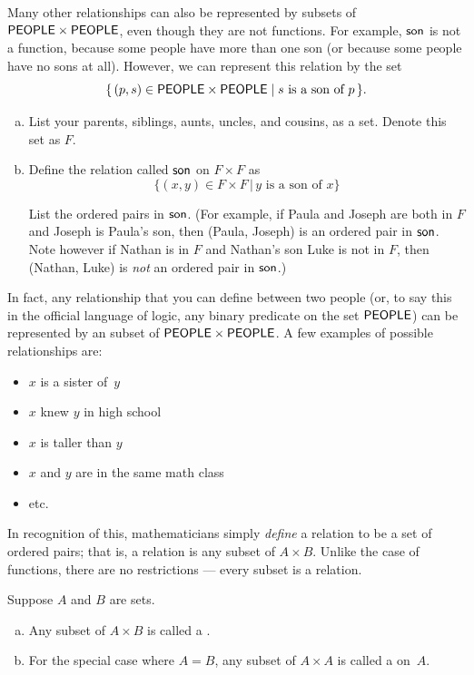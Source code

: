 Many other relationships can also be represented by subsets of $\sf{PEOPLE} \times \sf{PEOPLE}$, even though they are not functions. For example, $\sf{son}$ is not a function, because some people have more than one son (or because some people have no sons at all). However, we can represent this relation by the set
	$$ \{\, (p,s) \in  \sf{PEOPLE} \times \sf{PEOPLE} \mid \text{$s$ is a son of~$p$} \,\} .$$
	
\begin{exercise}\label{exercise:EquivalenceRelationsChap:student_son}
\begin{enumerate}[(a)]
\item
List your parents, siblings, aunts, uncles, and cousins, as a set.  Denote this set as $F$.
\item
Define the relation called $\sf{son}$ on $F \times F$ as
\[
\{ (x,y) \in F \times F \,|\, y \text{ is a son of } x \} \]

\noindent
List the ordered pairs in $\sf{son}$. (For example, if Paula and Joseph are both in $F$ and Joseph is Paula's son, then (Paula, Joseph) is an ordered pair in $\sf{son}$.  Note however if Nathan is in $F$ and Nathan's son Luke is not in $F$, then (Nathan, Luke) is \emph{not} an ordered pair in $\sf{son}$.)
\end{enumerate}
\end{exercise}
	
In fact, any relationship that you can define between two people (or, to say this in the official language of logic, any binary predicate on the set $\sf{PEOPLE}$) can be represented by an subset of $\sf{PEOPLE} \times \sf{PEOPLE}$. A few examples of possible relationships are:
	\begin{itemize}
	\item $x$ is a sister of~$y$
	\item $x$ knew $y$ in high school
	\item $x$ is taller than $y$
	\item $x$ and $y$ are in the same math class
	\item etc.
	\end{itemize}
In recognition of this, mathematicians simply \emph{define} a relation to be a set of ordered pairs; that is, a relation is any subset of $A \times B$. Unlike the case of functions, there are no restrictions --- every subset is a relation.


\begin{defn} \label{relation}  Suppose $A$ and $B$ are sets. 
\begin{enumerate}[(a)]
\item Any subset of $A \times B$ is called a .
\item For the special case where $A = B$, any subset of $A \times A$ is called a   on~$A$.
\end{enumerate}
\end{defn}


